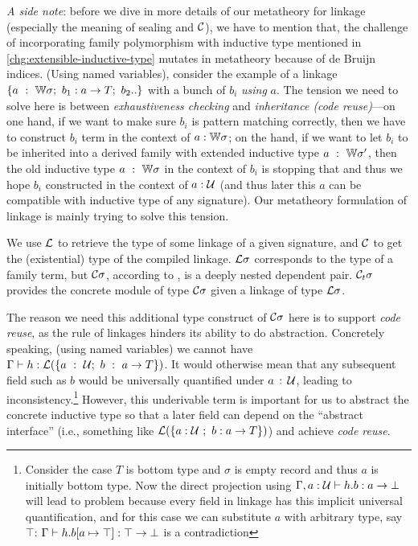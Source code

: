 \textit{A side note}: before we dive in more details of our metatheory
for linkage (especially the meaning of sealing and ${\mathcal{C}}$), we have to
mention that, the challenge of incorporating family polymorphism with
inductive type mentioned in \ref{chg:extensible-inductive-type} mutates
in metatheory because of de Bruijn indices. (Using named variables),
consider the example of a linkage $\{a~:~{\mathbb{W}} \sigma;\ b_1 : a \to T;\
b_2 ..\}$ with a bunch of $b_i$ \textit{using} $a$. The tension we need
to solve here is between \textit{exhaustiveness checking} and
\textit{inheritance (code reuse)}---on one hand, if we want to make sure
$b_i$ is pattern matching correctly, then we have to construct $b_i$
term in the context of $a : {\mathbb{W}}\sigma$; on the hand, if we want to let
$b_i$ to be inherited into a derived family with extended inductive type
$a~:~{\mathbb{W}} \sigma'$, then the old inductive type $a~:~{\mathbb{W}} \sigma$ in the
context of $b_i$ is stopping that and thus we hope $b_i$ constructed in
the context of $a : {\mathcal{U}}$ (and thus later this $a$ can be compatible with
inductive type of any signature). Our metatheory formulation of linkage
is mainly trying to solve this tension.



We use ${\mathcal{L}}$ to retrieve the type of some linkage of a given signature,
and ${\mathcal{C}}$ to get the (existential) type of the compiled linkage.
${\mathcal{L}}\sigma$ corresponds to the type of a family term, but ${\mathcal{C}}\sigma$,
according to \ruleref{Compile}, is a deeply nested dependent pair.
${\mathcal{C}_t} \sigma$ provides the concrete module of type ${\mathcal{C}}\sigma$ given a
linkage of type ${\mathcal{L}}\sigma$. 

The reason we need this additional type construct of ${\mathcal{C}}\sigma$ here is
to support \textit{code reuse}, as the rule of linkages hinders its
ability to do abstraction. Concretely speaking, (using named variables)
we cannot have $\goodTerm{\Gamma} %
{h}{\cL(\{a~:~\cU;~b~:~a \to T\})}$. It would otherwise mean that any
subsequent field such as $b$ would be universally quantified under
$a\,:\,{\mathcal{U}}$, leading to inconsistency.\footnote{%
Consider the case $T$ is bottom type and $\sigma$ is empty record and
thus $a$ is initially bottom type. Now the direct projection using
\ruleref{Sig Proj} ${ {\Gamma, a : {\mathcal{U}}} \vdash {h.b} : {a \to \bot} }$ will
lead to problem because every field in linkage has this implicit
universal quantification, and for this case we can substitute $a$ with
arbitrary type, say $\top$: ${ {\Gamma} \vdash {h.b[a \mapsto \top]} : {\top
\to \bot} }$ is a contradiction}
However, this underivable term is important for us to abstract the
concrete inductive type so that a later field can depend on the
``abstract interface'' (i.e., something like ${\mathcal{L}}(\{a:{\mathcal{U}}~;~b:a \to T\})$)
and achieve \textit{code reuse}. 

